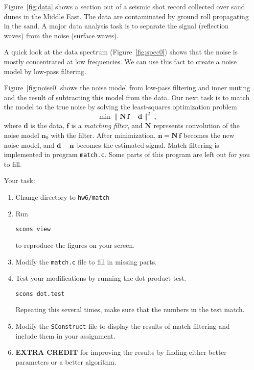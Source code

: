 Figure~\ref{fig:data} shows a section out of a seismic shot record
collected over sand dunes in the Middle East. The data are
contaminated by ground roll propagating in the sand. A major data
analysis task is to separate the signal (reflection waves) from the
noise (surface waves).


A quick look at the data spectrum (Figure~\ref{fig:spec0}) shows that the
noise is mostly concentrated at low frequencies. We can use this fact
to create a noise model by low-pass filtering.


Figure~\ref{fig:noise0} shows the noise model from low-pass filtering
and inner muting and the result of subtracting this model from the
data. Our next task is to match the model to the true noise by solving
the least-squares optimization problem
\begin{equation}
\label{eq:ls}
\min \|\mathbf{N}\,\mathbf{f} - \mathbf{d}\|^2\;,
\end{equation}
where $\mathbf{d}$ is the data, $\mathbf{f}$ is a \emph{matching filter}, and
$\mathbf{N}$ represents convolution of the noise model
$\mathbf{n}_0$ with the filter. After minimization, $\mathbf{n} =
\mathbf{N}\,\mathbf{f}$ becomes the new noise model, and
$\mathbf{d}-\mathbf{n}$ becomes the estimated signal. Match filtering
is implemented in program \texttt{match.c}. Some parts of this program
are left out for you to fill.

\lstset{language=c,numbers=left,numberstyle=\tiny,showstringspaces=false}


Your task:
\begin{enumerate}
\item Change directory to \texttt{hw6/match}
\item Run 
\begin{verbatim}
scons view
\end{verbatim}
to reproduce the figures on your screen.
\item Modify the \texttt{match.c} file to fill in missing parts.
\item Test your modifications by running the dot product test.
\begin{verbatim}
scons dot.test
\end{verbatim}
Repeating this several times, make sure that the numbers in the test match.
\item  Modify the \texttt{SConstruct} file to display the results of match filtering
and include them in your assignment.
\item \textbf{EXTRA CREDIT} for improving the results by finding either better parameters or a better algorithm. 
\end{enumerate}

